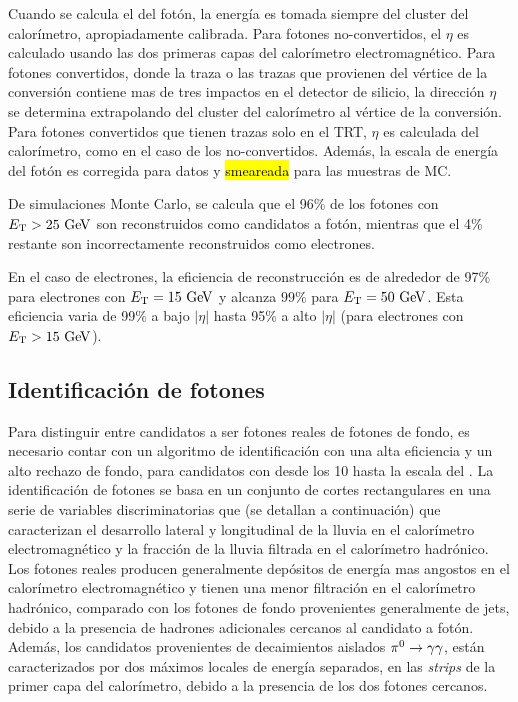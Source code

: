 Cuando se calcula el {\pt} del fotón, la energía es tomada siempre del cluster
del calorímetro, apropiadamente calibrada\cite{Banfi:1259219}. Para fotones
no-convertidos, el $\eta$ es calculado usando las dos primeras capas del
calorímetro electromagnético. Para fotones convertidos, donde la traza o las
trazas que provienen del vértice de la conversión contiene mas de tres impactos en
el detector de silicio, la dirección $\eta$ se determina extrapolando del
cluster del calorímetro al vértice de la conversión. Para fotones convertidos
que tienen trazas solo en el TRT, $\eta$ es calculada del calorímetro, %
como en el caso de los no-convertidos. Además, la escala de energía
del fotón es corregida para datos y \hl{smeareada} para las muestras de MC.

De simulaciones Monte Carlo, se calcula que el 96\% de los fotones con
$\et>25\gev$ son reconstruidos como candidatos a fotón, mientras que el 4\%
restante son incorrectamente reconstruidos como electrones. %

En el caso de electrones, la eficiencia de reconstrucción es de alrededor de
97\% para electrones con $\et=15 \gev$ y alcanza $99 \%$ para $\et=50\gev$. Esta
eficiencia varia de 99\% a bajo $|\eta|$ hasta 95\% a alto $|\eta|$ (para
electrones con $\et>15 \gev$). %


\subsection{Identificación de fotones}
\label{sec:fotones}

Para distinguir entre candidatos a ser fotones reales de fotones de fondo, es
necesario contar con un algoritmo de identificación con una alta eficiencia y un alto rechazo
de fondo, para candidatos con {\et} desde los 10 {\gev} hasta la escala del
{\tev}. La identificación de fotones se basa en un conjunto de cortes
rectangulares en una serie de variables discriminatorias que (se detallan a continuación)
que caracterizan el desarrollo lateral y longitudinal de la
lluvia en el calorímetro electromagnético y la fracción de la lluvia filtrada en
el calorímetro hadrónico. Los fotones reales producen generalmente depósitos de
energía mas angostos en el calorímetro electromagnético y tienen una menor
filtración en el calorímetro hadrónico, comparado con los fotones de fondo
provenientes generalmente de jets, debido a la presencia de hadrones adicionales cercanos al
candidato a fotón. Además, los candidatos provenientes de
decaimientos aislados $\pi^0 \to \gam\gam$, están caracterizados por dos máximos
locales de energía separados, en las \emph{strips} de la primer capa del calorímetro,
debido a la presencia de los dos fotones cercanos.


